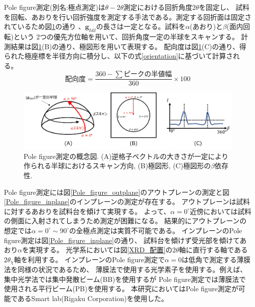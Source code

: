 \documentclass[dvipdfmx,12pt,a4paper]{jreport}
\begin{document}
			Pole figure測定(別名:極点測定)は$\theta-2\theta$測定における回折角度$2\theta$を固定し、
			試料を回転、あおりを行い回折強度を測定する手法である。測定する回折面は固定されているため図\ref{極点の測定方法}の通り
			、$\bm{g}_{hkl}$の長さは一定となる。試料を$\alpha$(あおり)と$\beta$(面内回転)という
			2つの優先方位軸を用いて、回折角度一定の半球をスキャンする。
			計測結果は図\ref{極点の測定方法}(B)の通り、極図形を用いて表現する。
			配向度は図\ref{極点の測定方法}(C)の通り、得られた極座標を半径方向に積分し、以下の式\eqref{orientation}に基づいて計算される。
			\begin{equation}
				配向度 = \frac{360 - \sum ピークの半値幅 }{360}\times 100
				\label{orientation}
			\end{equation}
			\begin{figure}[h]
				\centering
				\includegraphics[width=\linewidth]{極点の測定方法.jpg}
				\caption{Pole figure測定の概念図. (A)逆格子ベクトルの大きさが一定により作られる半球におけるスキャン方向, 
				(B)極図形, (C)極図形の$\beta$依存性.}
				\label{極点の測定方法}
			\end{figure}
			\newpage
			Pole figure測定には図\ref{Pole_figure_outplane}のアウトプレーンの測定と図\ref{Pole_figure_inplane}のインプレーンの測定が存在する。
			アウトプレーンは試料に対するあおりを試料台を傾けて実現する。
			よって、$\alpha=0^{\circ}$近傍においては試料の側面に入射されてしまうため測定が困難になる。
			結果的にアウトプレーンの想定では$\alpha=0^{\circ}\sim90^{\circ}$の全極点測定は実質不可能である。
			インプレーンのPole figure測定は図\ref{Pole_figure_inplane}の通り、
			試料台を傾けず受光部を傾けてあおり$\alpha$を実現する。
			光学系においては図\ref{XRD_配置}の$2\theta$軸に直行する軸である$2\theta_\chi$軸を利用する。
			インプレーンのPole figure測定で$\alpha=0$は低角で測定する薄膜法を同様の状況であるため、
			薄膜法で使用する光学素子を使用する。例えば、集中光学法では集中発散ビーム(BB)を使用するが
			Pole figure測定では薄膜法で使用される平行ビーム(PB)を使用する。
			本研究においてはPole figure測定が可能であるSmart lab(Rigaku Corporation)を使用した。
			
\end{document}
